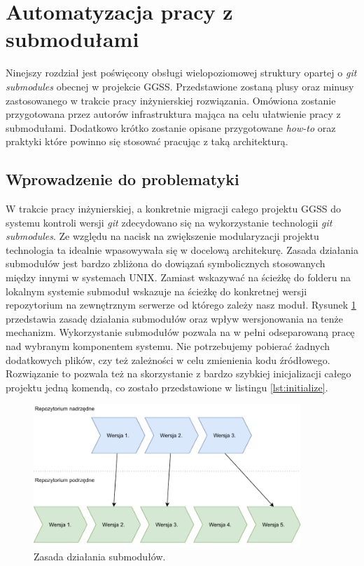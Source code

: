 \clearpage
\section{Automatyzacja pracy z submodułami}
\label{sec:gitio}

Ninejszy rozdział jest poświęcony obsługi wielopoziomowej struktury opartej o \emph{git submodules} obecnej w projekcie GGSS. Przedstawione zostaną plusy oraz minusy zastosowanego w trakcie pracy inżynierskiej rozwiązania. Omówiona zostanie przygotowana przez autorów infrastruktura mająca na celu ułatwienie pracy z submodułami. Dodatkowo krótko zostanie opisane przygotowane \emph{how-to} oraz praktyki które powinno się stosować pracując z taką architekturą.

\subsection{Wprowadzenie do problematyki}

W trakcie pracy inżynierskiej, a konkretnie migracji całego projektu GGSS do systemu kontroli wersji \emph{git} zdecydowano się na wykorzystanie technologii \emph{git submodules}. Ze względu na nacisk na zwiększenie modularyzacji projektu technologia ta idealnie wpasowywała się w docelową architekurę. Zasada działania submodułów jest bardzo zbliżona do dowiązań symbolicznych stosowanych między innymi w systemach UNIX. Zamiast wskazywać na ścieżkę do folderu na lokalnym systemie submoduł wskazuje na ścieżkę do konkretnej wersji repozytorium na zewnętrznym serwerze od którego zależy nasz moduł. Rysunek \ref{fig:submodules_links} przedstawia zasadę działania submodułów oraz wpływ wersjonowania na tenże mechanizm. Wykorzystanie submodułów pozwala na w pełni odseparowaną pracę nad wybranym komponentem systemu. Nie potrzebujemy pobierać żadnych dodatkowych plików, czy też zależności w celu zmienienia kodu źródłowego. Rozwiązanie to pozwala też na skorzystanie z bardzo szybkiej inicjalizacji całego projektu jedną komendą, co zostało przedstawione w listingu \ref{lst:initialize}.

\begin{figure}[H]
    \centering
    \includegraphics[width=0.9\textwidth]{components/infra/gitio_submodules_res/submodule_links}
    \caption{Zasada działania submodułów.}
    \label{fig:submodules_links}
\end{figure}

